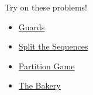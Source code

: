 \documentclass{beamer}
\begin{document}
\begin{frame}{Try on these problems!}
    \begin{itemize}
        \item \href{https://codeforces.com/gym/103536/problem/A}{Guards}
        \item \href{https://ru.kattis.com/courses/T-414-AFLV/aflv23/assignments/nb6wmc/problems/ru.sequence}{Split the Sequences}
        \item \href{https://codeforces.com/contest/1527/problem/E}{Partition Game}
        \item \href{https://codeforces.com/problemset/problem/834/D}{The Bakery}
    \end{itemize}
\end{frame}
\end{document}
